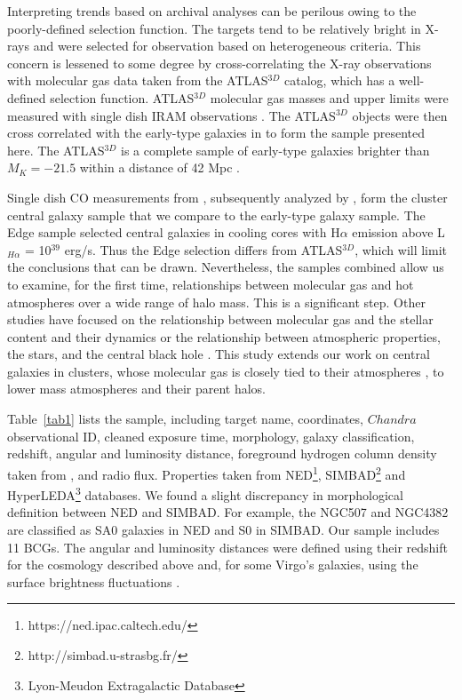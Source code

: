 \documentclass[iop]{emulateapj}
\begin{document}
Interpreting trends based on archival analyses can be perilous owing to the poorly-defined selection function.  The targets tend to be relatively bright in X-rays and were selected for observation based on heterogeneous criteria.  This concern is lessened to some degree by cross-correlating the X-ray observations with molecular gas data taken from the ATLAS${}^{3D}$ catalog, which has a well-defined selection function. ATLAS${}^{3D}$ molecular gas masses and upper limits were measured with single dish IRAM observations \citep{Young:11}. The ATLAS${}^{3D}$ objects were then cross correlated with the early-type galaxies in \citep{Babyk:17scal, Babyk17nature} to form the sample presented here. The ATLAS${}^{3D}$ is a complete sample of early-type galaxies brighter than $M_K = -21.5$ within a distance of 42 Mpc \citep{Young:11}.  

Single dish CO measurements from \citet{Edge:01}, subsequently analyzed by \citet{Pulido:17}, form the cluster central galaxy sample that we compare to the early-type galaxy sample.  The Edge sample selected central galaxies in cooling cores with H$\alpha$ emission above L$_{H\alpha}$ = 10$^{39}$ erg/s. Thus the Edge selection differs from ATLAS${}^{3D}$, which will  limit the conclusions that can be drawn.  Nevertheless, the samples combined allow us to examine, for the first time, relationships between molecular gas and hot atmospheres over a wide range of halo mass. This is a significant step.  Other studies have focused on the relationship between molecular gas and the stellar content and their dynamics \citep{Emsellem:01, Emsellem:11, Young:08} or the relationship between atmospheric properties,  the stars, and the central black hole \citep{Ma:14}. This study extends our work on central galaxies in clusters, whose molecular gas is closely tied to their atmospheres \citep{Edge:02, McNamara:14, Russell:14, Russell:15, Russell:17a, David:14, David:17, Tremblay:16, Vantyghem:17, Vantyghem:18, Pulido:17},  to lower mass atmospheres and their parent halos. 

Table~\ref{tab1} lists the sample, including target name, coordinates, $Chandra$ observational ID, cleaned exposure time, morphology, galaxy classification, redshift, angular and luminosity distance, foreground hydrogen column density taken from \citet{Dickey:90}, and radio flux. Properties taken from NED\footnote{https://ned.ipac.caltech.edu/}, SIMBAD\footnote{http://simbad.u-strasbg.fr/} and HyperLEDA\footnote{Lyon-Meudon Extragalactic Database} databases. We found a slight discrepancy in morphological definition between NED and SIMBAD. For example, the NGC507 and NGC4382 are classified as SA0 galaxies in NED and S0 in SIMBAD. Our sample includes 11 BCGs. The angular and luminosity distances were defined using their redshift for the cosmology described above and, for some Virgo's galaxies, using the surface brightness fluctuations \citep{Mei:07, Cappellari:11}.
\end{document}
